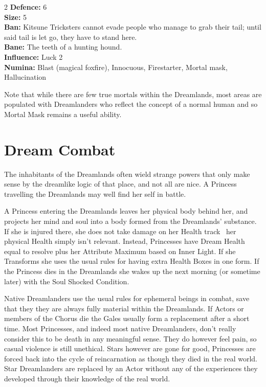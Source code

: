 \begin{multicols}{2}
\noindent \textbf{Defence:} 6\\

\noindent \textbf{Size:} 5\\

\noindent \textbf{Ban:} Kitsune Tricksters cannot evade people who manage to grab their tail; until said tail is let go, they have to stand here.\\

\noindent \textbf{Bane:} The teeth of a hunting hound.\\

\noindent \textbf{Influence:} Luck 2\\

\noindent \textbf{Numina:} Blast (magical foxfire), Innocuous, Firestarter, Mortal mask, Hallucination

Note that while there are few true mortals within the Dreamlands, most areas are populated with Dreamlanders who reflect the concept of a normal human and so Mortal Mask remains a useful ability.

\section*{Dream Combat}

The inhabitants of the Dreamlands often wield strange powers that only make sense by the dreamlike logic of that place, and not all are nice. A Princess travelling the Dreamlands may well find her self in battle. 

A Princess entering the Dreamlands leaves her physical body behind her, and projects her mind and soul into a body formed from the Dreamlands' substance.  If she is injured there, she does not take damage on her Health track \textendash\, her physical Health simply isn't relevant.  Instead, Princesses have Dream Health equal to resolve plus her Attribute Maximum based on Inner Light. If she Transforms she uses the usual rules for having extra Health Boxes in one form. If the Princess dies in the Dreamlands she wakes up the next morning (or sometime later) with the Soul Shocked Condition.

Native Dreamlanders use the usual rules for ephemeral beings in combat, save that they they are always fully material within the Dreamlands. If Actors or members of the Chorus die the Gales usually form a replacement after a short time. Most Princesses, and indeed most native Dreamlanders, don't really consider this to be death in any meaningful sense. They do however feel pain, so casual violence is still unethical. Stars however are gone for good, Princesses are forced back into the cycle of reincarnation as though they died in the real world. Star Dreamlanders are replaced by an Actor without any of the experiences they developed through their knowledge of the real world. 


\end{multicols}
